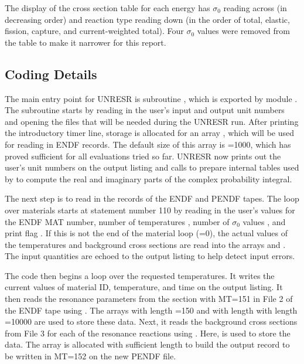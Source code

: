 \noindent
The display of the cross section table for each energy has $\sigma_0$
reading across (in decreasing order) and reaction type reading down
(in the order of total, elastic, fission, capture, and current-weighted
total).  Four $\sigma_0$ values were removed from the table to make
it narrower for this report.

\subsection{Coding Details}
\label{ssUNRESR_details}

The main entry point for UNRESR is subroutine ,
which is exported by module .
The subroutine starts by reading in the user's input and output unit
numbers and opening the files that will be needed during the
UNRESR run.  After printing the introductory timer line, storage is
allocated for an array , which will be used for reading
in ENDF records.  The default size of this array is =1000,
which has proved sufficient for all evaluations tried so far.
UNRESR now prints out the user's unit numbers on the output
listing and calls  to prepare
internal tables used by  to compute the
real and imaginary parts of the complex probability
integral.

The next step is to read in the  records of the
ENDF and PENDF tapes.  The loop over materials starts at
statement number 110 by reading in the user's values for the
ENDF MAT number, number of temperatures , number
of $\sigma_0$ values , and print flag .
If this is not the end of the material loop (=0),
the actual values of the temperatures and background cross
sections are read into the arrays  and .
The input quantities are echoed to the output listing to help
detect input errors.

The code then begins a loop over the requested temperatures.  It
writes the current values of material ID, temperature, and time
on the output listing. It then reads the resonance parameters
from the section with MT=151 in File 2 of the ENDF tape
using . The arrays  with length
=150 and  with length
with length =10000 are used to
store these data.  Next, it reads the background cross sections
from File 3 for each of the resonance reactions using
.  Here, 
is used to store the data.  The array  is allocated
with sufficient length to build the output record to be
written in MT=152 on the new PENDF file.

